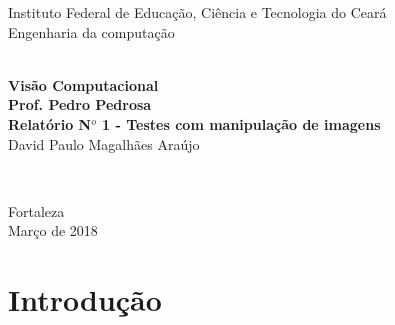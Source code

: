 \documentclass[12pt,fleqn]{article}
\begin{document}
\pagestyle {empty}


\vspace*{-2cm}
{\bf
\begin{center}
{\large
\hspace*{0cm}Instituto Federal de Educação, Ciência e Tecnologia do Ceará} \\
\vspace*{0.3cm}
\hspace*{0cm}Engenharia da computação\\
\hspace*{0cm}  \\
\end{center}}
\vspace{4.0cm}
\noindent
\begin{center}
{\Large \bf Visão Computacional \\ 
\vspace*{1.0cm}
Prof. Pedro Pedrosa \\
\vspace*{1.0cm}
Relatório N$^o$ 1 - Testes com manipulação de imagens} \\[3cm]
{\Large David Paulo Magalhães Araújo}\\[6mm]

\end{center}




{\raggedleft
\begin{minipage}[t]{6.3cm}
\setlength{\baselineskip}{0.25in}

\end{minipage}\\[6cm]}
\vspace{1cm}
{\center Fortaleza \\[3mm]
Março de 2018 \\}


\newpage

\newpage

\tableofcontents
\pagestyle {plain}

\setcounter{page}{0} 

  
\setlength{\parindent}{0in}  %
\parskip 5pt  
\newpage
\section{Introdução}
\end{document}
